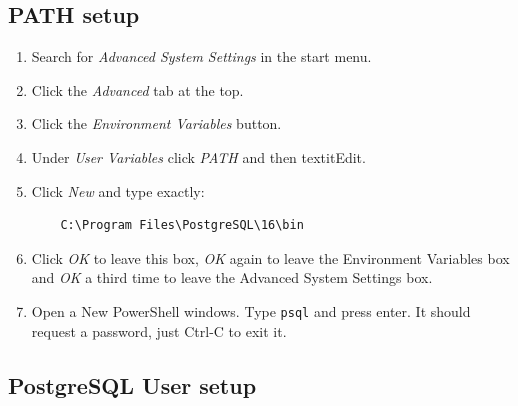 \documentclass{pgnotes}
\begin{document}
\subsection{PATH setup}

\begin{enumerate}

\item
	Search for \textit{Advanced System Settings} in the start menu.
	
\item 
	Click the \textit{Advanced} tab at the top.
	
\item 
	Click the \textit{Environment Variables} button.
	
\item 
	Under \textit{User Variables} click \textit{PATH} and then textit{Edit}.
	
\item 
	Click \textit{New} and type exactly:\\
\begin{verbatim}
	C:\Program Files\PostgreSQL\16\bin
\end{verbatim}

\item 
	Click \textit{OK} to leave this box, \textit{OK} again to leave the Environment Variables box and \textit{OK} a third time to leave the Advanced System Settings box.

\item
	Open a New PowerShell windows.
	Type \texttt{psql} and press enter.
	It should request a password, just Ctrl-C to exit it.

\end{enumerate}

\subsection{PostgreSQL User setup}
\end{document}
